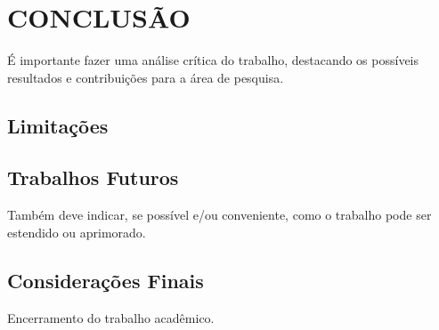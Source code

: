 
\chapter{CONCLUSÃO}
\label{chap:conclusao}

É importante fazer uma análise crítica do trabalho, destacando os possíveis resultados e contribuições para a área de pesquisa.

\section{Limitações}

\section{Trabalhos Futuros}

Também deve indicar, se possível e/ou conveniente, como o trabalho pode ser estendido ou aprimorado.

\section{Considerações Finais}

Encerramento do trabalho acadêmico.
